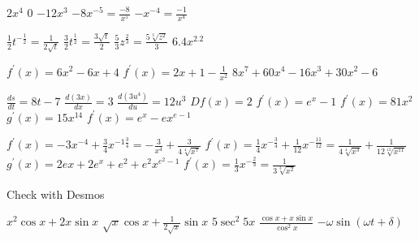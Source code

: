 \begin{Answer}[ref={exStandardDerivatives}]
	\Question %
\begin{tasks}
	\task $2 x^{4}$
	\task $0$
	\task $ -12 x^{3}$
	\task $ -8 x^{ -5} =\frac{ -8}{x^{5}}$
	\task $ -x^{ -4} =\frac{ -1}{x^{4}}$
\end{tasks}

\Question %
\begin{tasks}
	\task $\frac{1}{2} t^{ -\frac{1}{2}} =\frac{1}{2 \sqrt{t}}$
	\task $\frac{3}{2} t^{\frac{1}{2}} =\frac{3 \sqrt{t}}{2}$
	\task $\frac{5}{3} z^{\frac{2}{3}} =\frac{5 \sqrt[{3}]{z^{2}}}{3}$
	\task $6.4 x^{2.2}$ 
\end{tasks}

\Question %
\begin{tasks}
	\task $f^{ \prime } \left (x\right ) =6 x^{2} -6 x +4$
	\task $f^{ \prime } \left (x\right ) =2 x +1 -\frac{1}{x^{2}}$ 
	\task $8 x^{7} +60 x^{4} -16 x^{3} +30 x^{2} -6$
\end{tasks}

\Question 
\begin{tasks}
	\task $\frac{d s}{d t} =8 t -7$ 
	\task $\frac{d \left (3 x\right )}{d x} =3$ 
	\task $\frac{d \left (3 u^{4}\right )}{d u} =12 u^{3}$ 
	\task $D f \left (x\right ) =2$ 
	\task $f^{ \prime } \left (x\right ) =e^{x} -1$
	\task $f^{ \prime } \left (x\right ) =81 x^{2}$
	\task $g^{ \prime } \left (x\right ) =15 x^{14}$
	\task $f^{ \prime } \left (x\right ) =e^{x} -e x^{e -1}$ 
\end{tasks}

\Question %
\begin{tasks}
	\task $f^{ \prime } \left (x\right ) = -3 x^{ -4} +\frac{3}{4} x^{ -1\frac{3}{4}} = -\frac{3}{x^{4}} +\frac{3}{4 \sqrt[{4}]{x^{7}}}$
	\task $f^{ \prime } \left (x\right ) =\frac{1}{4} x^{ -\frac{3}{4}} +\frac{1}{12} x^{ -\frac{11}{12}} =\frac{1}{4 \sqrt[{4}]{x^{3}}} +\frac{1}{12 \sqrt[{12}]{x^{11}}}$ 
	\task $g^{ \prime } \left (x\right ) =2 e x +2 e^{x} +e^{2} +e^{2} x^{e^{2} -1}$
	\task $f^{ \prime } \left (x\right ) =\frac{1}{3} x^{ -\frac{2}{3}} =\frac{1}{3 \sqrt[{3}]{x^{2}}}$
\end{tasks}

\Question %
Check with Desmos

\Question %
\begin{tasks}
	\task $x^{2} \cos  x +2 x \sin  x$
	\task $\sqrt{x} \cos  x +\frac{1}{2 \sqrt{x}} \sin  x$
	\task $5 \sec ^{2} 5 x$
	\task $\frac{\cos  x +x \sin  x}{\cos ^{2} x}$ 
	\task $ -\omega  \sin  \left (\omega  t +\delta \right )$ 
\end{tasks}


\end{Answer}
